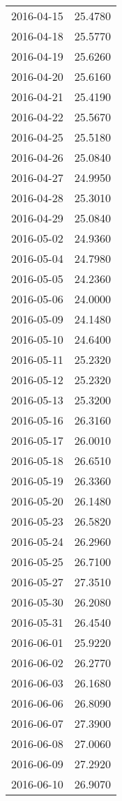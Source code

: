 \begin{tabular}{lr}
2016-04-15 &     25.4780 \\
2016-04-18 &     25.5770 \\
2016-04-19 &     25.6260 \\
2016-04-20 &     25.6160 \\
2016-04-21 &     25.4190 \\
2016-04-22 &     25.5670 \\
2016-04-25 &     25.5180 \\
2016-04-26 &     25.0840 \\
2016-04-27 &     24.9950 \\
2016-04-28 &     25.3010 \\
2016-04-29 &     25.0840 \\
2016-05-02 &     24.9360 \\
2016-05-04 &     24.7980 \\
2016-05-05 &     24.2360 \\
2016-05-06 &     24.0000 \\
2016-05-09 &     24.1480 \\
2016-05-10 &     24.6400 \\
2016-05-11 &     25.2320 \\
2016-05-12 &     25.2320 \\
2016-05-13 &     25.3200 \\
2016-05-16 &     26.3160 \\
2016-05-17 &     26.0010 \\
2016-05-18 &     26.6510 \\
2016-05-19 &     26.3360 \\
2016-05-20 &     26.1480 \\
2016-05-23 &     26.5820 \\
2016-05-24 &     26.2960 \\
2016-05-25 &     26.7100 \\
2016-05-27 &     27.3510 \\
2016-05-30 &     26.2080 \\
2016-05-31 &     26.4540 \\
2016-06-01 &     25.9220 \\
2016-06-02 &     26.2770 \\
2016-06-03 &     26.1680 \\
2016-06-06 &     26.8090 \\
2016-06-07 &     27.3900 \\
2016-06-08 &     27.0060 \\
2016-06-09 &     27.2920 \\
2016-06-10 &     26.9070 \\

\end{tabular}
